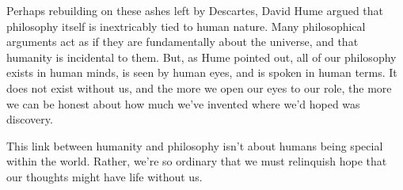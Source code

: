 \documentclass[20pt,]{extarticle}
\begin{document}
Perhaps rebuilding on these ashes left by Descartes, David Hume argued
that philosophy itself is inextricably tied to human nature. Many
philosophical arguments act as if they are fundamentally about the
universe, and that humanity is incidental to them. But, as Hume pointed
out, all of our philosophy exists in human minds, is seen by human eyes,
and is spoken in human terms. It does not exist without us, and the more
we open our eyes to our role, the more we can be honest about how much
we've invented where we'd hoped was discovery.

This link between humanity and philosophy isn't about humans being
special within the world. Rather, we're so ordinary that we must
relinquish hope that our thoughts might have life without us.
\end{document}
